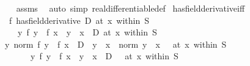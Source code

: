 \begin{isabellebody}
%
\isadelimproof
\ \ %
\endisadelimproof
%
\isatagproof
{}\isamarkupfalse%
\ assms\ \isamarkupfalse%
\ {\isacharparenleft}{\kern0pt}auto\ simp{\isacharcolon}{\kern0pt}\ real{\isacharunderscore}{\kern0pt}differentiable{\isacharunderscore}{\kern0pt}def{\isacharparenright}{\kern0pt}%
\endisatagproof
{\isafoldproof}%
%
\isadelimproof
\isanewline
%
\endisadelimproof
\isanewline
{}\isamarkupfalse%
\ has{\isacharunderscore}{\kern0pt}field{\isacharunderscore}{\kern0pt}derivative{\isacharunderscore}{\kern0pt}iff{\isacharcolon}{\kern0pt}\isanewline
\ \ {\isachardoublequoteopen}{\isacharparenleft}{\kern0pt}f\ has{\isacharunderscore}{\kern0pt}field{\isacharunderscore}{\kern0pt}derivative\ D{\isacharparenright}{\kern0pt}\ {\isacharparenleft}{\kern0pt}at\ x\ within\ S{\isacharparenright}{\kern0pt}\ {\isasymlongleftrightarrow}\isanewline
\ \ \ \ {\isacharparenleft}{\kern0pt}{\isacharparenleft}{\kern0pt}{\isasymlambda}y{\isachardot}{\kern0pt}\ {\isacharparenleft}{\kern0pt}f\ y\ {\isacharminus}{\kern0pt}\ f\ x{\isacharparenright}{\kern0pt}\ {\isacharslash}{\kern0pt}\ {\isacharparenleft}{\kern0pt}y\ {\isacharminus}{\kern0pt}\ x{\isacharparenright}{\kern0pt}{\isacharparenright}{\kern0pt}\ {\isasymlonglongrightarrow}\ D{\isacharparenright}{\kern0pt}\ {\isacharparenleft}{\kern0pt}at\ x\ within\ S{\isacharparenright}{\kern0pt}{\isachardoublequoteclose}\isanewline
%
\isadelimproof
%
\endisadelimproof
%
\isatagproof
{}\isamarkupfalse%
\ {\isacharminus}{\kern0pt}\isanewline
\ \ \isamarkupfalse%
\ {\isachardoublequoteopen}{\isacharparenleft}{\kern0pt}{\isacharparenleft}{\kern0pt}{\isasymlambda}y{\isachardot}{\kern0pt}\ norm\ {\isacharparenleft}{\kern0pt}f\ y\ {\isacharminus}{\kern0pt}\ f\ x\ {\isacharminus}{\kern0pt}\ D\ {\isacharasterisk}{\kern0pt}\ {\isacharparenleft}{\kern0pt}y\ {\isacharminus}{\kern0pt}\ x{\isacharparenright}{\kern0pt}{\isacharparenright}{\kern0pt}\ {\isacharslash}{\kern0pt}\ norm\ {\isacharparenleft}{\kern0pt}y\ {\isacharminus}{\kern0pt}\ x{\isacharparenright}{\kern0pt}{\isacharparenright}{\kern0pt}\ {\isasymlonglongrightarrow}\ {}{\isacharparenright}{\kern0pt}\ {\isacharparenleft}{\kern0pt}at\ x\ within\ S{\isacharparenright}{\kern0pt}\ \isanewline
\ \ \ \ \ \ {\isacharequal}{\kern0pt}\ {\isacharparenleft}{\kern0pt}{\isacharparenleft}{\kern0pt}{\isasymlambda}y{\isachardot}{\kern0pt}\ {\isacharparenleft}{\kern0pt}f\ y\ {\isacharminus}{\kern0pt}\ f\ x{\isacharparenright}{\kern0pt}\ {\isacharslash}{\kern0pt}\ {\isacharparenleft}{\kern0pt}y\ {\isacharminus}{\kern0pt}\ x{\isacharparenright}{\kern0pt}\ {\isacharminus}{\kern0pt}\ D{\isacharparenright}{\kern0pt}\ {\isasymlonglongrightarrow}\ {}{\isacharparenright}{\kern0pt}\ {\isacharparenleft}{\kern0pt}at\ x\ within\ S{\isacharparenright}{\kern0pt}{\isachardoublequoteclose}\isanewline

\end{isabellebody}
